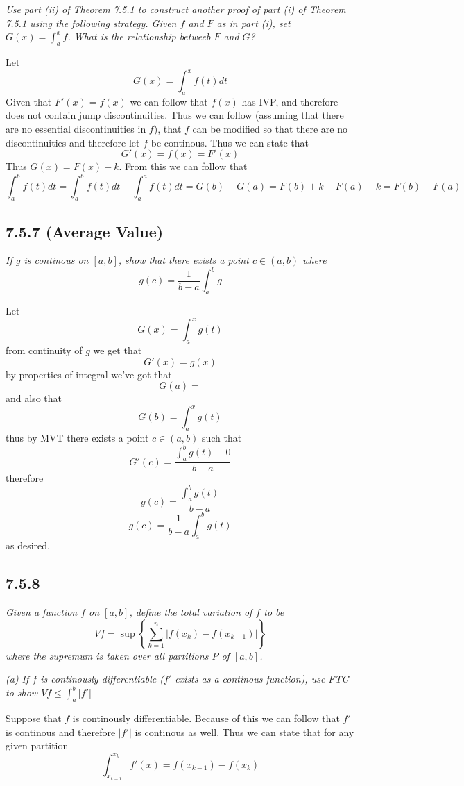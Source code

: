 \documentclass[11pt,oneside,titlepage]{book}
\begin{document}
\textit{Use part (ii) of Theorem 7.5.1 to construct another proof of part (i)
  of Theorem 7.5.1 using the following strategy. Given $f$ and $F$ as in part
  (i), set $G(x) = \int_a^x{f}$. What is the relationship betweeb $F$ and $G$?}

Let 
$$G(x) = \int_a^x{f(t)dt}$$
Given that $F'(x) = f(x)$ we can follow that $f(x)$ has IVP, and therefore
does not contain jump discontinuities. Thus we can follow (assuming that there
are no essential discontinuities in $f$), that
$f$ can be modified so that there are no discontinuities and therefore
let $f$ be continous. Thus we can state that
$$G'(x) = f(x) = F'(x)$$
Thus $G(x) = F(x) + k$. From this we can follow that
$$\int_a^b{f(t)dt} = \int_a^b{f(t)dt} - \int_a^a{f(t)dt} =
G(b) - G(a) = F(b) + k - F(a) - k = F(b) - F(a)$$

\subsection*{7.5.7 (Average Value)}

\textit{If $g$ is continous on $[a, b]$, show that there exists a point
  $c \in (a, b)$ where}
$$g(c) = \frac{1}{b - a}\int_a^b{g}$$

Let
$$G(x) = \int_a^x{g(t)}$$
from continuity of $g$ we get that
$$G'(x) = g(x)$$
by properties of integral we've got that
$$G(a) = $$
and also that
$$G(b) = \int_a^x{g(t)}$$
thus by MVT there exists a point $c \in (a, b)$ such that 
$$G'(c) = \frac{\int_a^b{g(t)} - 0}{b - a}$$
therefore
$$g(c) = \frac{\int_a^b{g(t)}}{b - a}$$
$$g(c) = \frac{1}{b - a}\int_a^b{g(t)}$$
as desired.

\subsection*{7.5.8}
\textit{Given a function $f$ on $[a, b]$, define the total variation of $f$ to
  be}
$$Vf = \sup\left\{\sum_{k = 1}^n{|f(x_k) - f(x_{k - 1})|}\right\}$$
\textit{where the supremum is taken over all partitions $P$ of $[a, b]$.}

\textit{(a) If $f$ is continously differentiable ($f'$ exists as a continous
  function), use FTC to show $Vf \leq \int_a^b{|f'|}$}

Suppose that $f$ is continously differentiable. Because of this we can follow
that $f'$ is continous and therefore $|f'|$ is continous as well. Thus
we can state that for any given partition
$$\int_{x_{k - 1}}^{x_k}{f'(x)} = f(x_{k - 1}) - f(x_k)$$
\end{document}
